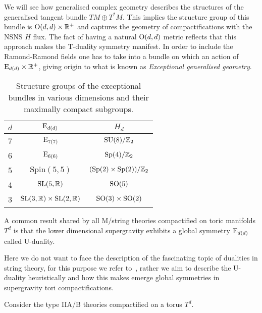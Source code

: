 \documentclass[debug]{phd}
\begin{document}
					We will see how generalised complex geometry describes the structures of the generalised tangent bundle $TM \oplus T^*M$.
					This implies the structure group of this bundle is $\mathrm{O}(d,d) \times \mathbb{R}^+$ and captures the geometry of compactifications with the NSNS $H$ flux.
					The fact of having a natural $\mathrm{O}(d,d)$ metric reflects that this approach makes the T-duality symmetry manifest.
					In order to include the Ramond-Ramond fields one has to take into a bundle on which an action of $\mathrm{E}_{d(d)} \times \mathbb{R}^+$, giving origin to what is known as \emph{Exceptional generalised geometry}.
							\begin{table}[h!]
								\centering
								\begin{tabular}{l c c }
										$d$	&	$\mathrm{E}_{d(d)}$				&	$H_{d}$							\\
										\midrule
										7	& 	$\mathrm{E}_{7(7)}$				&	$\mathrm{SU}(8)/\mathbb{Z}_2$						\\[1.2mm]	
										6 	&	$\mathrm{E}_{6(6)}$				&	$\mathrm{Sp}(4)/\mathbb{Z}_2$						\\[1.2mm]	
										5 	&	$\mathrm{Spin}(5,5)$		&	$(\mathrm{Sp}(2) \times \mathrm{Sp}(2))/\mathbb{Z}_2$			\\[1.2mm]	
										4	&	$\mathrm{SL}(5, \mathbb{R})$				&	$\mathrm{SO}(5)$							\\[1.2mm]
										3	&	$\mathrm{SL}(3,\mathbb{R}) \times \mathrm{SL}(2,\mathbb{R})$	&	$\mathrm{SO}(3) \times \mathrm{SO}(2)$				\\[1.2mm]
									\bottomrule
								\end{tabular}
								\caption{Structure groups of the exceptional bundles in various dimensions and their maximally compact subgroups.}
								\label{tab:Eddgroups}
							\end{table}
					
					A common result shared by all M/string theories compactified on toric manifolds $T^d$ is that the lower dimensional supergravity exhibits a global symmetry $\mathrm{E}_{d(d)}$ called U-duality.
					
					Here we do not want to face the description of the fascinating topic of dualities in string theory, for this purpose we refer to~\cite{polchinski, BlumLustThe}, rather we aim to describe the U-duality heuristically and how this makes emerge global symmetries in supergravity tori compactifications.
					
					Consider the type IIA/B theories compactified on a torus $T^d$.
					
\end{document}
